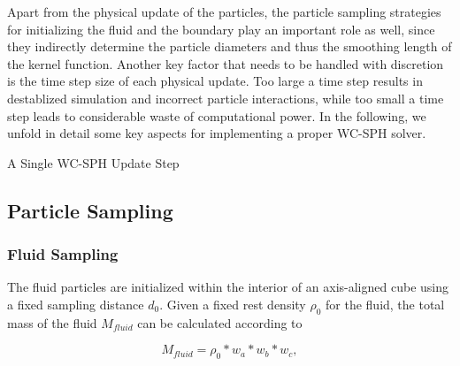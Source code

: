 \documentclass[
	11pt, 
	DIV10,
	ngerman,
	a4paper, 
	oneside, 
	headings=normal, 
	captions=tableheading,
	final, 
	numbers=noenddot
]{scrartcl}
\begin{document}
Apart from the physical update of the particles, the particle sampling strategies for initializing the fluid and the boundary play an important role as well, since they indirectly determine the particle diameters and thus the smoothing length of the kernel function. Another key factor that needs to be handled with discretion is the time step size of each physical update. Too large a time step results in destablized simulation and incorrect particle interactions, while too small a time step leads to considerable waste of computational power. In the following, we unfold in detail some key aspects for implementing a proper WC-SPH solver.

\large
\begin{algorithm}
	\DontPrintSemicolon
	\SetAlgoLined
	\caption{\label{alg1} A Single WC-SPH Update Step}
\end{algorithm}
\normalsize

\subsection{Particle Sampling}
\subsubsection{Fluid Sampling}

The fluid particles are initialized within the interior of an axis-aligned cube using a fixed sampling distance $ d_{0} $. Given a fixed rest density $ \rho_{0} $ for the fluid, the total mass of the fluid $ M_{fluid} $ can be calculated according to

\begin{equation}
	\label{eq1}
	M_{fluid} = \rho_{0} * w_{a} * w_{b} * w_{c},
\end{equation}
\end{document}
